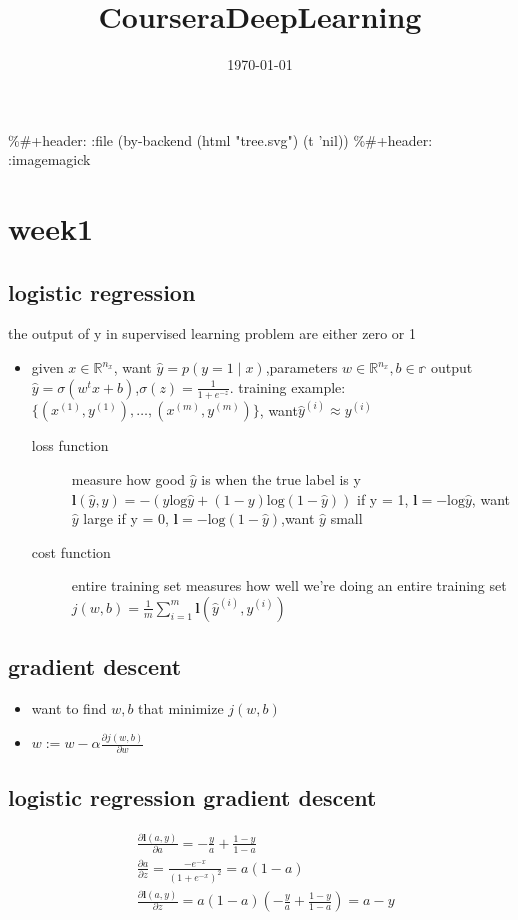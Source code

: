 \documentclass[11pt]{article}
\date{\today}
\title{CourseraDeepLearning}
\begin{document}
\maketitle
\tableofcontents

\%\#+header: :file (by-backend (html "tree.svg") (t 'nil))
\%\#+header: :imagemagick
\section{week1}
\label{sec-1}
\subsection{logistic regression}
\label{sec-1-1}
the output of y in supervised learning problem are either zero or 1
\begin{itemize}
\item given $x\in\mathbb{R}^{n_x}$, want $\hat{y}=p(y=1\mid x)$,parameters $w\in\mathbb{R}^{n_x},b\in\mathbb{r}$
output $\hat{y}=\sigma(w^tx+b)$,$\sigma(z)=\frac{1}{1+e^{-z}}$.
training example:$\{(x^{(1)},y^{(1)}),\dots,(x^{(m)},y^{(m)})\}$, want$\hat{y}^{(i)}\approx y^{(i)}$
\begin{description}
\item[{loss function}] measure how good $\hat{y}$ is when the true label is y
$\boldsymbol{l}(\hat{y},y)=-(y\text{log}\hat{y}+(1-y)\text{log}(1-\hat{y}))$
if y = 1, $\boldsymbol{l}=-\text{log}\hat{y}$, want $\hat{y}$ large
if y = 0, $\boldsymbol{l}=-\text{log}(1-\hat{y})$,want $\hat{y}$ small
\item[{cost function}] entire training set
measures how well we're doing an entire training set
$j(w,b)=\frac{1}{m}\displaystyle\sum_{i=1}^m\boldsymbol{l}(\hat{y}^{(i)},y^{(i)})$
\end{description}
\end{itemize}
\subsection{gradient descent}
\label{sec-1-2}
\begin{itemize}
\item want to find $w,b$ that minimize $j(w,b)$
\item $w:=w-\alpha\frac{\partial j(w,b)}{\partial w}$
\end{itemize}
\subsection{logistic regression gradient descent}
\label{sec-1-3}
\begin{align*}
&\frac{\partial\boldsymbol{l}(a,y)}{\partial a}=-\frac{y}{a}+\frac{1-y}{1-a}\\
&\frac{\partial a}{\partial z}=\frac{-e^{-x}}{(1+e^{-x})^2}=a(1-a)\\
&\frac{\partial\boldsymbol{l}(a,y)}{\partial z}=a(1-a)(-\frac{y}{a}+\frac{1-y}{1-a})=a-y
\end{align*}
\end{document}
